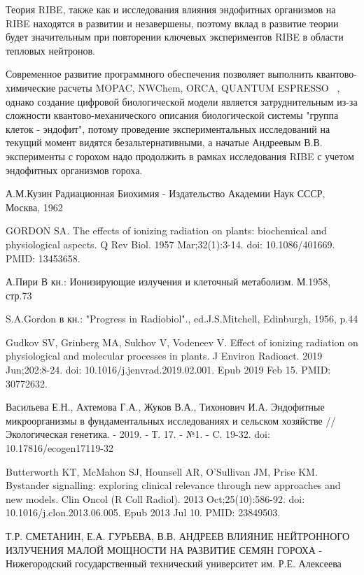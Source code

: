 \documentclass[11pt]{article}
\begin{document}
Теория RIBE, также как и исследования влияния эндофитных организмов на RIBE находятся в развитии и незавершены, поэтому вклад в развитие теории будет значительным при повторении ключевых экспериментов RIBE в области тепловых нейтронов.

Современное развитие программного обеспечения позволяет выполнить квантово-химические расчеты MOPAC, NWChem, ORCA, QUANTUM ESPRESSO~\cite{qe} , однако создание цифровой биологической модели является затруднительным из-за сложности квантово-механического описания биологической системы "группа клеток - эндофит", потому проведение экспериментальных исследований на текущий момент видятся безальтернативными, а начатые Андреевым В.В. эксперименты с горохом надо продолжить в рамках исследования RIBE с учетом эндофитных организмов гороха.

\begin{thebibliography}{3}

А.М.Кузин Радиационная Биохимия - Издательство Академии Наук СССР, Москва, 1962

GORDON SA. The effects of ionizing radiation on plants: biochemical and physiological aspects. Q Rev Biol. 1957 Mar;32(1):3-14. doi: 10.1086/401669. PMID: 13453658.

А.Пири В кн.: Ионизирующие излучения и клеточный метаболизм. М.1958, стр.73

S.A.Gordon в кн.: "Progress in Radiobiol"., ed.J.S.Mitchell, Edinburgh, 1956, p.44


Gudkov SV, Grinberg MA, Sukhov V, Vodeneev V. Effect of ionizing radiation on physiological and molecular processes in plants. J Environ Radioact. 2019 Jun;202:8-24. doi: 10.1016/j.jenvrad.2019.02.001. Epub 2019 Feb 15. PMID: 30772632.

 Васильева Е.Н., Ахтемова Г.А., Жуков В.А., Тихонович И.А. Эндофитные микроорганизмы в фундаментальных исследованиях и сельском хозяйстве // Экологическая генетика. - 2019. - Т. 17. - №1. - C. 19-32. doi: 10.17816/ecogen17119-32

 Butterworth KT, McMahon SJ, Hounsell AR, O'Sullivan JM, Prise KM. Bystander signalling: exploring clinical relevance through new approaches and new models. Clin Oncol (R Coll Radiol). 2013 Oct;25(10):586-92. doi: 10.1016/j.clon.2013.06.005. Epub 2013 Jul 10. PMID: 23849503.

Т.Р. СМЕТАНИН, Е.А. ГУРЬЕВА, В.В. АНДРЕЕВ ВЛИЯНИЕ НЕЙТРОННОГО ИЗЛУЧЕНИЯ МАЛОЙ МОЩНОСТИ НА РАЗВИТИЕ СЕМЯН ГОРОХА - Нижегородский государственный технический университет им. Р.Е. Алексеева


\end{thebibliography}
\end{document}
